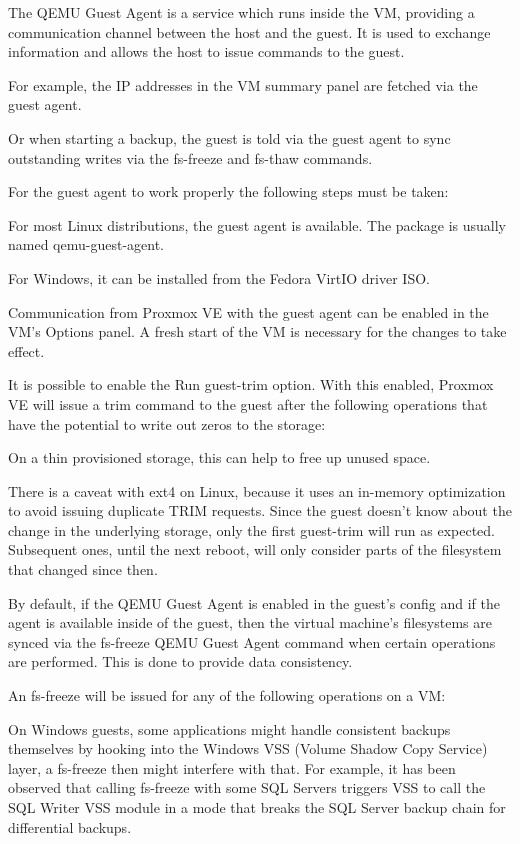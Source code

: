 The QEMU Guest Agent is a service which runs inside the VM, providing a communication channel between the host and the guest. It is used to exchange information and allows the host to issue commands to the guest.

For example, the IP addresses in the VM summary panel are fetched via the guest agent.

Or when starting a backup, the guest is told via the guest agent to sync outstanding writes via the fs-freeze and fs-thaw commands.

For the guest agent to work properly the following steps must be taken:

For most Linux distributions, the guest agent is available. The package is usually named qemu-guest-agent.

For Windows, it can be installed from the Fedora VirtIO driver ISO.

Communication from Proxmox VE with the guest agent can be enabled in the VM’s Options panel. A fresh start of the VM is necessary for the changes to take effect.

It is possible to enable the Run guest-trim option. With this enabled, Proxmox VE will issue a trim command to the guest after the following operations that have the potential to write out zeros to the storage:

On a thin provisioned storage, this can help to free up unused space.

There is a caveat with ext4 on Linux, because it uses an in-memory optimization to avoid issuing duplicate TRIM requests. Since the guest doesn’t know about the change in the underlying storage, only the first guest-trim will run as expected. Subsequent ones, until the next reboot, will only consider parts of the filesystem that changed since then.

By default, if the QEMU Guest Agent is enabled in the guest’s config and if the agent is available inside of the guest, then the virtual machine’s filesystems are synced via the fs-freeze QEMU Guest Agent command when certain operations are performed. This is done to provide data consistency.

An fs-freeze will be issued for any of the following operations on a VM:

On Windows guests, some applications might handle consistent backups themselves by hooking into the Windows VSS (Volume Shadow Copy Service) layer, a fs-freeze then might interfere with that. For example, it has been observed that calling fs-freeze with some SQL Servers triggers VSS to call the SQL Writer VSS module in a mode that breaks the SQL Server backup chain for differential backups.

